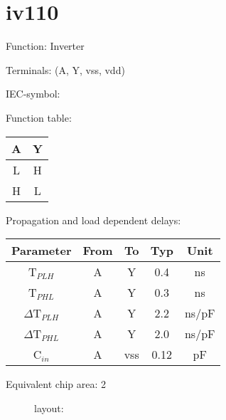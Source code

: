 \section{iv110}

Function: Inverter

Terminals: (A, Y, vss, vdd)


IEC-symbol:
\begin{figure}[bth]
\end{figure}

Function table:
\begin{table}[bth]
\begin{tabular}{|c||c|}
\hline
A	&Y\\
\hline
L	&H\\
H	&L\\
\hline
\end{tabular}

\vspace{1cm}

Propagation and load dependent delays:\\

\begin{tabular}{|c|c|c|c|c|}
\hline
Parameter               &From            &To   &Typ    &Unit\\
\hline
T$_{PLH}$               &A     		&Y      &0.4    &ns\\
T$_{PHL}$               &A    		&Y      &0.3    &ns\\
\hline
$\Delta$T$_{PLH}$       &A           	&Y      &2.2    &ns/pF\\
$\Delta$T$_{PHL}$       &A           	&Y      &2.0    &ns/pF\\
\hline
C$_{in}$                &A	    	&vss    &0.12   &pF\\
\hline
\end{tabular}
\end{table}

Equivalent chip area: 2






\begin{figure}[bth]
layout:\\
 

\end{figure}


\clearpage
